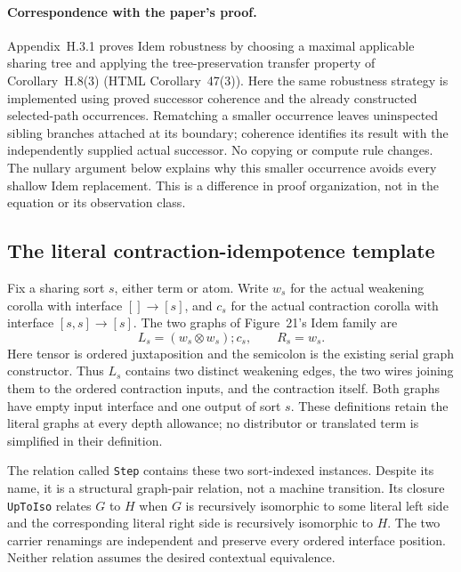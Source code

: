\paragraph{Correspondence with the paper's proof.}
Appendix~H.3.1 proves Idem robustness by choosing a maximal applicable sharing
tree and applying the tree-preservation transfer property of Corollary~H.8(3)
(HTML Corollary~47(3)). Here the same robustness strategy is implemented using
proved successor coherence and the already constructed selected-path
occurrences. Rematching a smaller occurrence leaves uninspected sibling
branches attached at its boundary; coherence identifies its result with the
independently supplied actual successor. No copying or compute rule changes.
The nullary argument below explains why this smaller occurrence avoids every
shallow Idem replacement. This is a difference in proof organization, not in
the equation or its observation class.

\subsection{The literal contraction-idempotence template}
Fix a sharing sort $s$, either term or atom. Write $w_s$ for the actual
weakening corolla with interface $[]\to[s]$, and $c_s$ for the actual
contraction corolla with interface $[s,s]\to[s]$. The two graphs of
Figure~21's Idem family are
\[
 L_s=(w_s\otimes w_s);c_s,
 \qquad R_s=w_s.
\]
Here tensor is ordered juxtaposition and the semicolon is the existing
serial graph constructor. Thus $L_s$ contains two distinct weakening edges,
the two wires joining them to the ordered contraction inputs, and the
contraction itself. Both graphs have empty input interface and one output
of sort $s$. These definitions retain the literal graphs at every depth
allowance; no distributor or translated term is simplified in their definition.

\par{}


The relation called \texttt{Step} contains these two sort-indexed instances.
Despite its name, it is a structural graph-pair relation, not a machine
transition. Its closure \texttt{UpToIso} relates $G$ to $H$ when $G$ is
recursively isomorphic to some literal left side and the corresponding
literal right side is recursively isomorphic to $H$. The two carrier
renamings are independent and preserve every ordered interface position.
Neither relation assumes the desired contextual equivalence.

